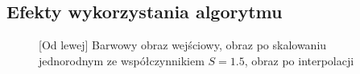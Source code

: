 \documentclass[a4paper,12pt, titlepage]{report}
\begin{document}
\subsection*{Efekty wykorzystania algorytmu}
\begin{figure}[h]
    \centering
    \caption{[Od lewej] Barwowy obraz wejściowy, obraz po skalowaniu jednorodnym ze współczynnikiem \(S=1.5\), obraz po interpolacji}%
    \label{fig:rysunek}%
\end{figure}
\FloatBarrier
\end{document}
